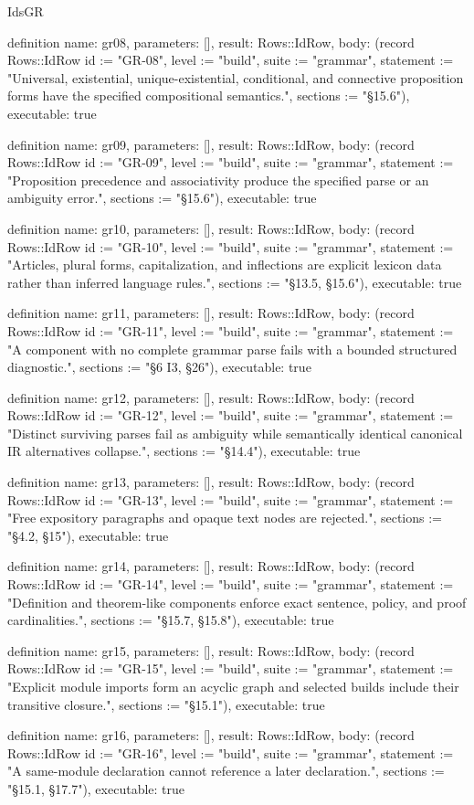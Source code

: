 \begin{lexlean}{IdsGR}
\begin{semanticmodule}
definition{
  name: gr08,
  parameters: [],
  result: Rows::IdRow,
  body: (record Rows::IdRow {id := "GR-08", level := "build", suite := "grammar", statement := "Universal, existential, unique-existential, conditional, and connective proposition forms have the specified compositional semantics.", sections := "§15.6"}),
  executable: true
}

definition{
  name: gr09,
  parameters: [],
  result: Rows::IdRow,
  body: (record Rows::IdRow {id := "GR-09", level := "build", suite := "grammar", statement := "Proposition precedence and associativity produce the specified parse or an ambiguity error.", sections := "§15.6"}),
  executable: true
}

definition{
  name: gr10,
  parameters: [],
  result: Rows::IdRow,
  body: (record Rows::IdRow {id := "GR-10", level := "build", suite := "grammar", statement := "Articles, plural forms, capitalization, and inflections are explicit lexicon data rather than inferred language rules.", sections := "§13.5, §15.6"}),
  executable: true
}

definition{
  name: gr11,
  parameters: [],
  result: Rows::IdRow,
  body: (record Rows::IdRow {id := "GR-11", level := "build", suite := "grammar", statement := "A component with no complete grammar parse fails with a bounded structured diagnostic.", sections := "§6 I3, §26"}),
  executable: true
}

definition{
  name: gr12,
  parameters: [],
  result: Rows::IdRow,
  body: (record Rows::IdRow {id := "GR-12", level := "build", suite := "grammar", statement := "Distinct surviving parses fail as ambiguity while semantically identical canonical IR alternatives collapse.", sections := "§14.4"}),
  executable: true
}

definition{
  name: gr13,
  parameters: [],
  result: Rows::IdRow,
  body: (record Rows::IdRow {id := "GR-13", level := "build", suite := "grammar", statement := "Free expository paragraphs and opaque text nodes are rejected.", sections := "§4.2, §15"}),
  executable: true
}

definition{
  name: gr14,
  parameters: [],
  result: Rows::IdRow,
  body: (record Rows::IdRow {id := "GR-14", level := "build", suite := "grammar", statement := "Definition and theorem-like components enforce exact sentence, policy, and proof cardinalities.", sections := "§15.7, §15.8"}),
  executable: true
}

definition{
  name: gr15,
  parameters: [],
  result: Rows::IdRow,
  body: (record Rows::IdRow {id := "GR-15", level := "build", suite := "grammar", statement := "Explicit module imports form an acyclic graph and selected builds include their transitive closure.", sections := "§15.1"}),
  executable: true
}

definition{
  name: gr16,
  parameters: [],
  result: Rows::IdRow,
  body: (record Rows::IdRow {id := "GR-16", level := "build", suite := "grammar", statement := "A same-module declaration cannot reference a later declaration.", sections := "§15.1, §17.7"}),
  executable: true
}
\end{semanticmodule}
\end{lexlean}
